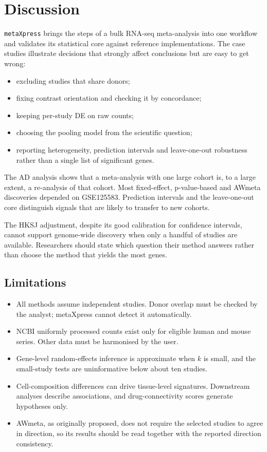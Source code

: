 \documentclass[11pt,a4paper]{article}
\begin{document}
\section{Discussion}
\texttt{metaXpress} brings the steps of a bulk RNA-seq meta-analysis into one workflow and validates its statistical core against reference implementations. The case studies illustrate decisions that strongly affect conclusions but are easy to get wrong:
\begin{itemize}[noitemsep,topsep=2pt]
    \item excluding studies that share donors;
    \item fixing contrast orientation and checking it by concordance;
    \item keeping per-study DE on raw counts;
    \item choosing the pooling model from the scientific question;
    \item reporting heterogeneity, prediction intervals and leave-one-out robustness rather than a single list of significant genes.
\end{itemize}

The AD analysis shows that a meta-analysis with one large cohort is, to a large extent, a re-analysis of that cohort. Most fixed-effect, p-value-based and AWmeta discoveries depended on GSE125583. Prediction intervals and the leave-one-out core distinguish signals that are likely to transfer to new cohorts.

The HKSJ adjustment, despite its good calibration for confidence intervals, cannot support genome-wide discovery when only a handful of studies are available. Researchers should state which question their method answers rather than choose the method that yields the most genes.

\subsection{Limitations}
\begin{itemize}[noitemsep,topsep=2pt]
    \item All methods assume independent studies. Donor overlap must be checked by the analyst; metaXpress cannot detect it automatically.
    \item NCBI uniformly processed counts exist only for eligible human and mouse series. Other data must be harmonised by the user.
    \item Gene-level random-effects inference is approximate when $k$ is small, and the small-study tests are uninformative below about ten studies.
    \item Cell-composition differences can drive tissue-level signatures. Downstream analyses describe associations, and drug-connectivity scores generate hypotheses only.
    \item AWmeta, as originally proposed, does not require the selected studies to agree in direction, so its results should be read together with the reported direction consistency.
\end{itemize}
\end{document}

